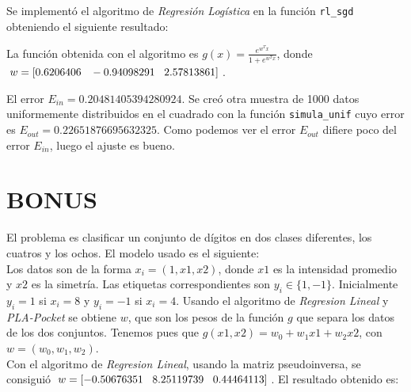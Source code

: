 \documentclass{article}
\begin{document}
Se implementó el algoritmo de \textit{Regresión Logística} en la función \texttt{rl\_sgd} obteniendo el siguiente resultado:

\begin{figure}[H]
  \centering
\end{figure}

La función obtenida con el algoritmo es $g(x)= \frac{e^{w^Tx}}{1+e^{w^Tx}}$, donde $w = [0.6206406 \hspace{3mm} -0.94098291 \hspace{3mm} 2.57813861]$.

El error  $E_{in} = 0.20481405394280924$. Se creó otra muestra de 1000 datos uniformemente distribuidos en el cuadrado con la función \texttt{simula\_unif} cuyo error es $E_{out} = 0.22651876695632325$. Como podemos ver el error $E_{out}$ difiere poco del error $E_{in}$, luego el ajuste es bueno.

\section{BONUS}

El problema es clasificar un conjunto de dígitos en dos clases diferentes, los cuatros y los ochos.
El modelo usado es el siguiente:\\
Los datos son de la forma $x_i = (1, x1, x2)$, donde $x1$ es la intensidad promedio y $x2$ es la simetría. Las etiquetas correspondientes son $y_i \in \{1, -1\}$. Inicialmente $y_i = 1$ si $x_i = 8$ y $y_i = -1$ si $x_i = 4$.
Usando el algoritmo de \textit{Regresion Lineal} y \textit{PLA-Pocket} se obtiene $w$, que son los pesos de la función $g$ que separa los datos de los dos conjuntos. Tenemos pues que $g(x1,x2) = w_0 + w_1x1 + w_2x2$, con $w = (w_0, w_1, w_2)$.\\

Con el algoritmo de \textit{Regresion Lineal}, usando la matriz pseudoinversa, se consiguió $w = [-0.50676351 \hspace{3mm} 8.25119739  \hspace{3mm} 0.44464113]$. El resultado obtenido es:
\end{document}

